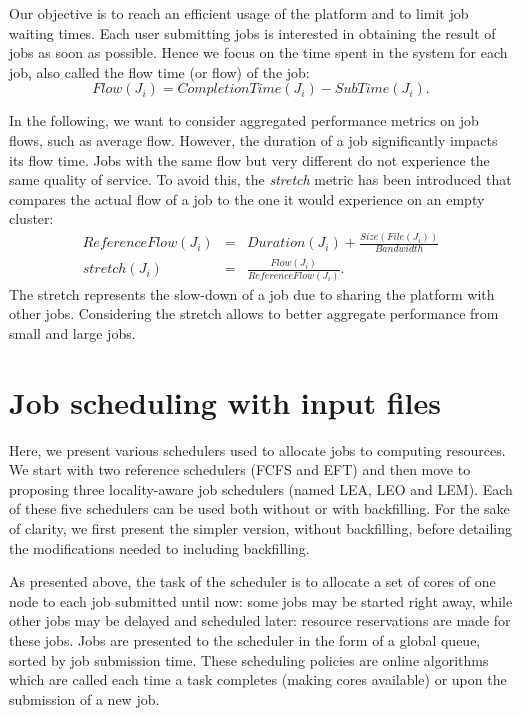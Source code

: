 \documentclass[sigconf,review,anonymous]{acmart}
\newcommand{\rev}[1]{{\color{blue}{#1}}}
\newcommand{\file}{\ensuremath{\mathit{File}}\xspace}
\newcommand{\size}{\ensuremath{\mathit{Size}}\xspace}
\newcommand{\duration}{\mathit{Duration}\xspace}
\newcommand{\bandwidth}{\mathit{Bandwidth}\xspace}
\newcommand{\submissiontime}{\mathit{SubTime}\xspace}
\newcommand{\emptyflow}{\mathit{ReferenceFlow}\xspace}
\newcommand{\completiontime}{\mathit{CompletionTime}\xspace}
\newcommand{\start}{\mathit{StartTime}\xspace}
\newcommand{\us}{\ensuremath{\mathit{user~session}}\xspace}
\begin{document}
Our objective is to reach an efficient usage of the platform and to
limit job waiting times. Each
user submitting jobs is interested in obtaining the result of jobs
as soon as possible. Hence we focus on the time spent in the system
for each job, also called the flow time (or flow) of the job:
$$
\mathit{Flow}(J_i) = \completiontime(J_i) - \submissiontime(J_i).
$$

In the following, we want to consider aggregated performance metrics on
job flows, such as average flow. However, the duration
of a job significantly impacts its flow time. Jobs with the same
flow but very different \rev{duration} do not experience the same quality
of service. To avoid this, the \emph{stretch} metric has been
introduced that compares the actual flow of a job to the one it would
experience on an empty cluster:
\begin{eqnarray*}
\emptyflow(J_i) &=& \duration(J_i) + \frac{\size(\file(J_i))}{\bandwidth}\\
\mathit{stretch}(J_i) &=& \frac{\mathit{Flow}(J_i)}{\emptyflow(J_i)}.
\end{eqnarray*}
The stretch represents the slow-down of a job due to sharing the
platform with other jobs. Considering the stretch
allows to better aggregate performance from small and large jobs.


\section{Job scheduling with input files}\label{sec.schedulers}


Here, we present various schedulers used to allocate jobs to
computing resources. We start with two reference schedulers (FCFS and EFT)
and then move to proposing three locality-aware job schedulers (named
LEA, LEO and LEM). Each of these five schedulers can be used both
without or with backfilling. For the sake of clarity, we first present
the simpler version, without backfilling, before detailing the modifications needed to including backfilling.

As presented above, the task of the scheduler is to allocate a set of
cores of one node
to each job submitted until now: some jobs may be started right away,
while other jobs may be delayed and scheduled later: resource
reservations are made for these jobs. Jobs are presented to the
scheduler in the form of a global queue, sorted by job submission
time. These scheduling policies are online algorithms which are called each time
a task completes (making cores available) or upon the submission of
a new job.
\end{document}
